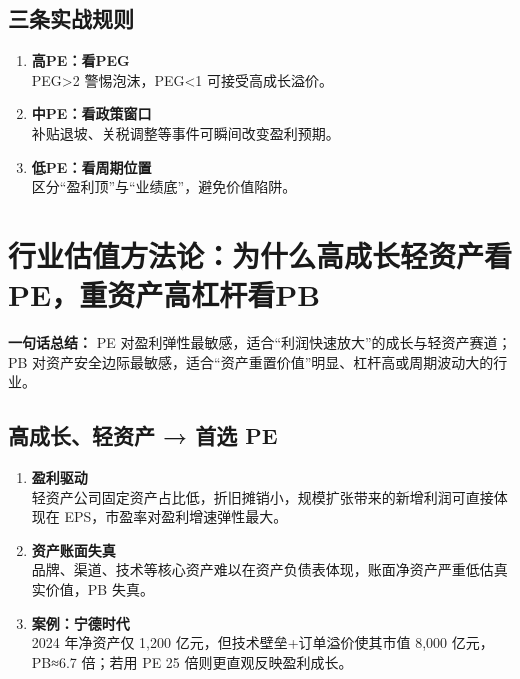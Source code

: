 \subsection{三条实战规则}
\begin{enumerate}[leftmargin=*, nosep]
    \item \textbf{高PE：看PEG}  \\
    PEG>2 警惕泡沫，PEG<1 可接受高成长溢价。
    \item \textbf{中PE：看政策窗口}  \\
    补贴退坡、关税调整等事件可瞬间改变盈利预期。
    \item \textbf{低PE：看周期位置}  \\
    区分“盈利顶”与“业绩底”，避免价值陷阱。
\end{enumerate}

\section{行业估值方法论：为什么高成长轻资产看PE，重资产高杠杆看PB}
\textbf{一句话总结：}  
{\color{red}PE 对盈利弹性最敏感，适合“利润快速放大”的成长与轻资产赛道；PB 对资产安全边际最敏感，适合“资产重置价值”明显、杠杆高或周期波动大的行业。}

\subsection{高成长、轻资产 → 首选 PE}
\begin{enumerate}[leftmargin=*, nosep]
    \item \textbf{盈利驱动}  \\
    轻资产公司固定资产占比低，折旧摊销小，规模扩张带来的新增利润可直接体现在 EPS，市盈率对盈利增速弹性最大。
    \item \textbf{资产账面失真}  \\
    品牌、渠道、技术等核心资产难以在资产负债表体现，账面净资产严重低估真实价值，PB 失真。
    \item \textbf{案例：宁德时代}  \\
    2024 年净资产仅 1,200 亿元，但技术壁垒+订单溢价使其市值 8,000 亿元，PB≈6.7 倍；若用 PE 25 倍则更直观反映盈利成长。
\end{enumerate}

